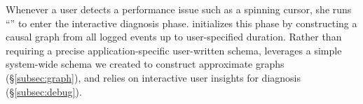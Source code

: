 Whenever a user detects a performance issue such as a spinning cursor, she runs
``'' to enter the interactive diagnosis phase.  \xxx initializes
this phase by constructing a causal graph from all logged events up to
user-specified duration.  Rather than requiring a precise application-specific
user-written schema, \xxx leverages a simple system-wide schema we created to
construct approximate graphs (\S\ref{subsec:graph}), and relies on interactive
user insights for diagnosis (\S\ref{subsec:debug}).


